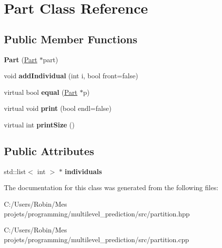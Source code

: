 \hypertarget{class_part}{}\section{Part Class Reference}
\label{class_part}
\subsection*{Public Member Functions}
\begin{DoxyCompactItemize}
\item 
\hypertarget{class_part_a4fc5eedff4d310041e3ebee54693f4ac}{}{\bfseries Part} (\hyperlink{class_part}{Part} $\ast$part)\label{class_part_a4fc5eedff4d310041e3ebee54693f4ac}

\item 
\hypertarget{class_part_aa711a575b6b5bb0080b4e9fa7e20bbe1}{}void {\bfseries add\+Individual} (int i, bool front=false)\label{class_part_aa711a575b6b5bb0080b4e9fa7e20bbe1}

\item 
\hypertarget{class_part_a8b37a2433f60fba0c5dcce393e4f5a86}{}virtual bool {\bfseries equal} (\hyperlink{class_part}{Part} $\ast$p)\label{class_part_a8b37a2433f60fba0c5dcce393e4f5a86}

\item 
\hypertarget{class_part_a2d3c13012c781d8651b820e60d57c724}{}virtual void {\bfseries print} (bool endl=false)\label{class_part_a2d3c13012c781d8651b820e60d57c724}

\item 
\hypertarget{class_part_a501f9fdbc4efd9ce00e1eef4a07f033e}{}virtual int {\bfseries print\+Size} ()\label{class_part_a501f9fdbc4efd9ce00e1eef4a07f033e}

\end{DoxyCompactItemize}
\subsection*{Public Attributes}
\begin{DoxyCompactItemize}
\item 
\hypertarget{class_part_a12f364b91efb5702af492cbdef1990fe}{}std\+::list$<$ int $>$ $\ast$ {\bfseries individuals}\label{class_part_a12f364b91efb5702af492cbdef1990fe}

\end{DoxyCompactItemize}


The documentation for this class was generated from the following files\+:\begin{DoxyCompactItemize}
\item 
C\+:/\+Users/\+Robin/\+Mes projets/programming/multilevel\+\_\+prediction/src/partition.\+hpp\item 
C\+:/\+Users/\+Robin/\+Mes projets/programming/multilevel\+\_\+prediction/src/partition.\+cpp\end{DoxyCompactItemize}
